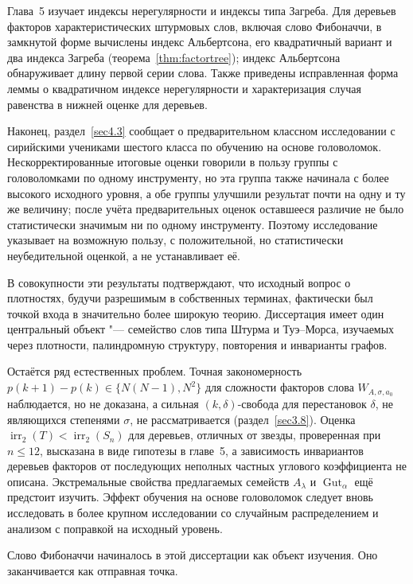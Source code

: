 \documentclass[a4paper,14pt]{extreport}
\theoremstyle{plain}
\theoremstyle{definition}
\theoremstyle{remark}
\begin{document}
Глава~5 изучает индексы нерегулярности и индексы типа Загреба. Для деревьев факторов характеристических штурмовых слов, включая слово Фибоначчи, в замкнутой форме вычислены индекс Альбертсона, его квадратичный вариант и два индекса Загреба (теорема~\ref{thm:factortree}); индекс Альбертсона обнаруживает длину первой серии слова. Также приведены исправленная форма леммы о квадратичном индексе нерегулярности и характеризация случая равенства в нижней оценке для деревьев.

Наконец, раздел~\ref{sec4.3} сообщает о предварительном классном исследовании с сирийскими учениками шестого класса по обучению на основе головоломок. Нескорректированные итоговые оценки говорили в пользу группы с головоломками по одному инструменту, но эта группа также начинала с более высокого исходного уровня, а обе группы улучшили результат почти на одну и ту же величину; после учёта предварительных оценок оставшееся различие не было статистически значимым ни по одному инструменту. Поэтому исследование указывает на возможную пользу, с положительной, но статистически неубедительной оценкой, а не устанавливает её.

В совокупности эти результаты подтверждают, что исходный вопрос о плотностях, будучи разрешимым в собственных терминах, фактически был точкой входа в значительно более широкую теорию. Диссертация имеет один центральный объект "--- семейство слов типа Штурма и Туэ--Морса, изучаемых через плотности, палиндромную структуру, повторения и инварианты графов.

Остаётся ряд естественных проблем. Точная закономерность $p(k+1)-p(k)\in\{N(N-1),N^2\}$ для сложности факторов слова $W_{A,\sigma,a_0}$ наблюдается, но не доказана, а сильная $(k,\delta)$-свобода для перестановок $\delta$, не являющихся степенями $\sigma$, не рассматривается (раздел~\ref{sec3.8}). Оценка $\operatorname{irr}_2(T)<\operatorname{irr}_2(S_n)$ для деревьев, отличных от звезды, проверенная при $n\le12$, высказана в виде гипотезы в главе~5, а зависимость инвариантов деревьев факторов от последующих неполных частных углового коэффициента не описана.
Экстремальные свойства предлагаемых семейств $A_\lambda$ и $\operatorname{Gut}_\alpha$ ещё предстоит изучить. Эффект обучения на основе головоломок следует вновь исследовать в более крупном исследовании со случайным распределением и анализом с поправкой на исходный уровень.

Слово Фибоначчи начиналось в этой диссертации как объект изучения. Оно заканчивается как отправная точка.    
\end{document}

